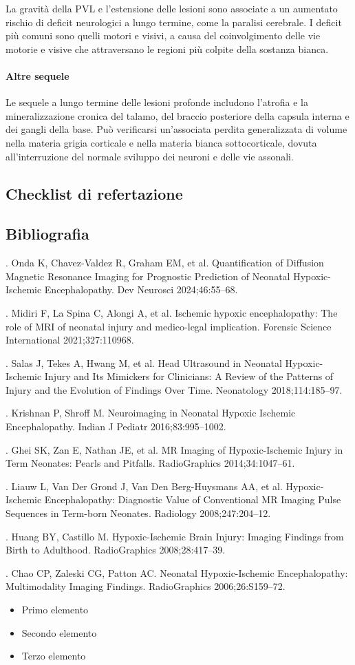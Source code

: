 La gravità della PVL e l'estensione delle lesioni sono associate a un aumentato rischio di deficit neurologici a lungo termine, come la paralisi cerebrale. I deficit più comuni sono quelli motori e visivi, a causa del coinvolgimento delle vie motorie e visive che attraversano le regioni più colpite della sostanza bianca.

\paragraph{Altre sequele}
Le sequele a lungo termine delle lesioni profonde includono l'atrofia e la mineralizzazione cronica del talamo, del braccio posteriore della capsula interna e dei gangli della base. Può verificarsi un'associata perdita generalizzata di volume nella materia grigia corticale e nella materia bianca sottocorticale, dovuta all'interruzione del normale sviluppo dei neuroni e delle vie assonali.

\subsection{Checklist di refertazione}

\subsection{Bibliografia}
\tiny{
.  Onda K, Chavez-Valdez R, Graham EM, et al. Quantification of Diffusion Magnetic Resonance Imaging for Prognostic Prediction of Neonatal Hypoxic-Ischemic Encephalopathy. Dev Neurosci 2024;46:55–68.

.  Midiri F, La Spina C, Alongi A, et al. Ischemic hypoxic encephalopathy: The role of MRI of neonatal injury and medico-legal implication. Forensic Science International 2021;327:110968.

.  Salas J, Tekes A, Hwang M, et al. Head Ultrasound in Neonatal Hypoxic-Ischemic Injury and Its Mimickers for Clinicians: A Review of the Patterns of Injury and the Evolution of Findings Over Time. Neonatology 2018;114:185–97.

.  Krishnan P, Shroff M. Neuroimaging in Neonatal Hypoxic Ischemic Encephalopathy. Indian J Pediatr 2016;83:995–1002.

.  Ghei SK, Zan E, Nathan JE, et al. MR Imaging of Hypoxic-Ischemic Injury in Term Neonates: Pearls and Pitfalls. RadioGraphics 2014;34:1047–61.

.  Liauw L, Van Der Grond J, Van Den Berg-Huysmans AA, et al. Hypoxic-Ischemic Encephalopathy: Diagnostic Value of Conventional MR Imaging Pulse Sequences in Term-born Neonates. Radiology 2008;247:204–12.

.  Huang BY, Castillo M. Hypoxic-Ischemic Brain Injury: Imaging Findings from Birth to Adulthood. RadioGraphics 2008;28:417–39.

.  Chao CP, Zaleski CG, Patton AC. Neonatal Hypoxic-Ischemic Encephalopathy: Multimodality Imaging Findings. RadioGraphics 2006;26:S159–72.

}


\begin{itemize}[label=$\square$] %
	\item Primo elemento
	\item Secondo elemento
	\item Terzo elemento
\end{itemize}
